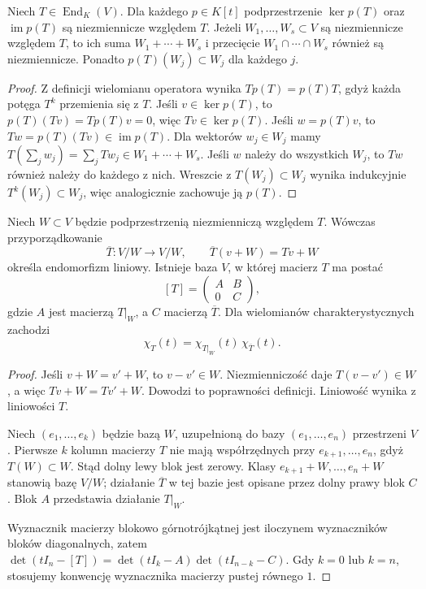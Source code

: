 \begin{stwierdzenie}
\label{prop:lin16-invariant-kernels}
Niech \(T\in\operatorname{End}_K(V)\).
Dla każdego \(p\in K[t]\)
podprzestrzenie \(\ker p(T)\) oraz
\(\operatorname{im}p(T)\) są niezmiennicze
względem \(T\).
Jeżeli \(W_1,\ldots,W_s\subset V\)
są niezmiennicze względem \(T\),
to ich suma \(W_1+\cdots+W_s\)
i przecięcie \(W_1\cap\cdots\cap W_s\)
również są niezmiennicze.
Ponadto \(p(T)(W_j)\subset W_j\)
dla każdego \(j\).
\end{stwierdzenie}
\begin{proof}
Z definicji wielomianu operatora wynika
\(Tp(T)=p(T)T\), gdyż każda potęga \(T^k\)
przemienia się z \(T\).
Jeśli \(v\in\ker p(T)\), to
\(p(T)(Tv)=Tp(T)v=0\),
więc \(Tv\in\ker p(T)\).
Jeśli \(w=p(T)v\), to
\(Tw=p(T)(Tv)\in\operatorname{im}p(T)\).
Dla wektorów \(w_j\in W_j\)
mamy \(T(\sum_jw_j)=\sum_jTw_j
\in W_1+\cdots+W_s\).
Jeśli \(w\) należy do wszystkich \(W_j\),
to \(Tw\) również należy do każdego z nich.
Wreszcie z \(T(W_j)\subset W_j\)
wynika indukcyjnie \(T^k(W_j)\subset W_j\),
więc analogicznie zachowuje ją \(p(T)\).
\end{proof}

\begin{twierdzenie}
\label{thm:lin16-quotient-block}
Niech \(W\subset V\) będzie podprzestrzenią
niezmienniczą względem \(T\).
Wówczas przyporządkowanie
\[
 \overline T\colon V/W\to V/W,\qquad
 \overline T(v+W)=Tv+W
\]
określa endomorfizm liniowy.
Istnieje baza \(V\), w której macierz \(T\)
ma postać
\[
 [T]=\begin{pmatrix}A&B\\0&C\end{pmatrix},
\]
gdzie \(A\) jest macierzą \(T|_W\),
a \(C\) macierzą \(\overline T\).
Dla wielomianów charakterystycznych
zachodzi
\[
 \chi_T(t)=\chi_{T|_W}(t)\,\chi_{\overline T}(t).
\]
\end{twierdzenie}
\begin{proof}
Jeśli \(v+W=v'+W\), to \(v-v'\in W\).
Niezmienniczość daje \(T(v-v')\in W\),
a więc \(Tv+W=Tv'+W\).
Dowodzi to poprawności definicji.
Liniowość wynika z liniowości \(T\).

Niech \((e_1,\ldots,e_k)\)
będzie bazą \(W\), uzupełnioną
do bazy \((e_1,\ldots,e_n)\) przestrzeni \(V\).
Pierwsze \(k\) kolumn macierzy \(T\)
nie mają współrzędnych przy
\(e_{k+1},\ldots,e_n\), gdyż \(T(W)\subset W\).
Stąd dolny lewy blok jest zerowy.
Klasy \(e_{k+1}+W,\ldots,e_n+W\)
stanowią bazę \(V/W\);
działanie \(\overline T\) w tej bazie
jest opisane przez dolny prawy blok \(C\).
Blok \(A\) przedstawia działanie \(T|_W\).

Wyznacznik macierzy blokowo górnotrójkątnej
jest iloczynem wyznaczników bloków diagonalnych,
zatem
\(\det(tI_n-[T])=\det(tI_k-A)\det(tI_{n-k}-C)\).
Gdy \(k=0\) lub \(k=n\), stosujemy
konwencję wyznacznika macierzy pustej równego \(1\).
\end{proof}

